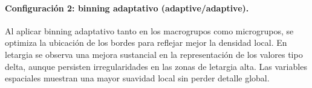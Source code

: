     


\paragraph{Configuración 2: binning adaptativo (adaptive/adaptive).}  
Al aplicar binning adaptativo tanto en los macrogrupos como microgrupos, se optimiza la ubicación de los bordes para reflejar mejor la densidad local. En letargia se observa una mejora sustancial en la representación de los valores tipo delta, aunque persisten irregularidades en las zonas de letargia alta. Las variables espaciales muestran una mayor suavidad local sin perder detalle global.

